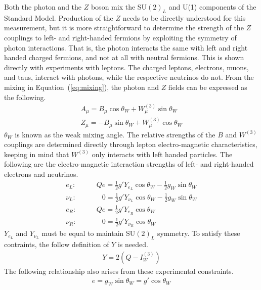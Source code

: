 Both the photon and the $Z$ boson mix the SU$(2)_L$ and U(1) components of the Standard Model.
Production of the $Z$ needs to be directly understood for this measurement,
but it is more straightforward to determine the strength of the $Z$ couplings to left-
and right-handed fermions by exploiting the symmetry of photon interactions.
That is, the photon interacts the same with left and right handed charged fermions,
and not at all with neutral fermions.
This is shown directly with experiments with leptons.
The charged leptons, electrons, muons, and taus, interact with photons,
while the respective neutrinos do not.
From the mixing in Equation~(\ref{eq:mixing}),
the photon and $Z$ fields can be expressed as the following.
\begin{gather}
  A_\mu = B_\mu \cos \theta_W + W_\mu^{(3)} \sin \theta_W \\
  Z_\mu = - B_\mu \sin \theta_W + W_\mu^{(3)} \cos \theta_W \label{eq:z-force}
\end{gather}
$\theta_W$ is known as the weak mixing angle.
The relative strengths of the $B$ and $W^{(3)}$ couplings
are determined directly through lepton electro-magnetic characteristics,
keeping in mind that $W^{(3)}$ only interacts with left handed particles.
The following are the electro-magnetic interaction strengths of left- and right-handed electrons and neutrinos.
\begin{align}
  e_L:& \qquad Qe = \frac12 g' Y_{e_L} \cos \theta_W - \frac12 g_W \sin \theta_W \\
  \nu_L:& \qquad \phantom{Q}0 = \frac12 g' Y_{\nu_L} \cos \theta_W - \frac12 g_W \sin \theta_W \\
  e_R:& \qquad Qe = \frac12 g' Y_{e_R} \cos \theta_W \\
  \nu_R:& \qquad \phantom{Q}0 = \frac12 g' Y_{\nu_R} \cos \theta_W
\end{align}
$Y_{e_L}$ and $Y_{\nu_L}$ must be equal to maintain SU$(2)_L$ symmetry.
To satisfy these contraints, the follow definition of $Y$ is needed.
\begin{gather}
  Y = 2\left(Q - I_W^{(3)}\right)
\end{gather}
The following relationship also arises from these experimental constraints.
\begin{gather}
  e = g_W \sin \theta_W = g' \cos \theta_W
\end{gather}

